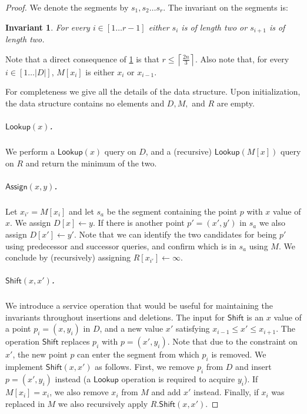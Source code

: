 \documentclass[10pt,a4paper]{article}
\newcommand{\assign}{\leftarrow}
\newcommand{\AssignOp}{\mathsf{Assign}}
\newcommand{\ShiftOp}{\mathsf{Shift}}
\newcommand{\Lookup}{\mathsf{Lookup}}
\newcommand{\para}[1]{\vspace{-0.1in} \subparagraph*{#1}}
\newcommand{\ceil}[1]{\left\lceil{#1}\right\rceil}
\newtheorem{invariant}{Invariant}
\begin{document}
\begin{proof}
We denote the segments by $s_1,s_2 \ldots s_r$. The invariant on the segments is:
\begin{invariant}\label{inv:addminsegments}
    For every $i\in[1\ldots r-1]$ either $s_i$ is of length two or $s_{i+1}$ is of length two.
\end{invariant}
Note that a direct consequence of \cref{inv:addminsegments} is that $r \le \ceil{\frac{2n}{3}}$.
Also note that, for every $i\in [1\ldots |D|]$, $M[x_i]$ is either $x_i$ or $x_{i-1}$. 

For completeness we give all the details of the data structure.
Upon initialization, the data structure contains no elements and $D,M,$ and $R$ are empty.

\para{$\Lookup(x)$.}
We perform a $\Lookup(x)$ query on $D$, and a (recursive) $\Lookup(M[x])$ query on $R$ and return the minimum of the two.

\para{$\AssignOp(x,y)$.}
Let $x_{i'}=M[x_i]$ and let $s_a$ be the segment containing the point $p$ with $x$ value of $x$.
We assign $D[x] \assign y$. If there is another point $p'=(x',y')$ in $s_a$ we also  assign $D[x']\assign y'$.
Note that we can identify the two candidates for being $p'$ using predecessor and successor queries, and confirm which is in $s_a$ using $M$.
We conclude by (recursively) assigning $R[x_{i'}]\assign \infty$.

\para{$\ShiftOp(x,x')$.}
We introduce a service operation that would be useful for maintaining the invariants throughout insertions and deletions.
The input for $\ShiftOp$ is an $x$ value of a point $p_i = (x,y_i)$ in $D$, and a new value $x'$ satisfying $x_{i-1} \le  x' \le x_{i+1}$.
The operation $\ShiftOp$ replaces $p_i$ with $p = (x',y_i)$.
Note that due to the constraint on $x'$, the new point $p$ can enter the segment from which $p_i$ is removed.
We implement $\ShiftOp(x,x')$ as follows.
First, we remove $p_i$ from $D$ and insert $p = (x',y_i)$ instead (a $\Lookup$ operation is required to acquire $y_i$).
If $M[x_i] = x_i$, we also remove $x_i$ from $M$ and add $x'$ instead.
Finally, if $x_i$ was replaced in $M$ we also recursively apply $R.\ShiftOp(x,x')$.


\end{proof}
\end{document}
